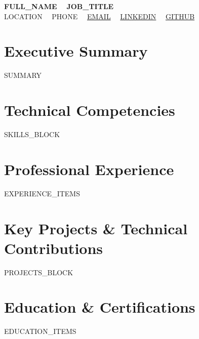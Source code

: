 \documentclass[9pt,letterpaper]{article}
\begin{document}
\begin{center}
  {\Large \textbf{{{FULL_NAME}}}} \ \textbar \ \textbf{{{JOB_TITLE}}} \\[1pt]
  \scriptsize
  {{LOCATION}} \ \textbullet \ 
  {{PHONE}} \ \textbullet \ 
  \href{mailto:{{EMAIL}}}{{{EMAIL}}} \ \textbullet \ 
  \href{https://{{LINKEDIN}}}{{{LINKEDIN}}} \ \textbullet \ 
  \href{https://{{GITHUB}}}{{{GITHUB}}}
\end{center}

\vspace{-6pt}

\section{Executive Summary}
\scriptsize
{{SUMMARY}}

\vspace{1pt}
\section{Technical Competencies}
\scriptsize
{{SKILLS_BLOCK}}

\vspace{1pt}
\section{Professional Experience}
\scriptsize
{{EXPERIENCE_ITEMS}}

\vspace{1pt}
\section{Key Projects \& Technical Contributions}
\scriptsize
{{PROJECTS_BLOCK}}

\vspace{1pt}
\section{Education \& Certifications}
\scriptsize
{{EDUCATION_ITEMS}}
\end{document}
